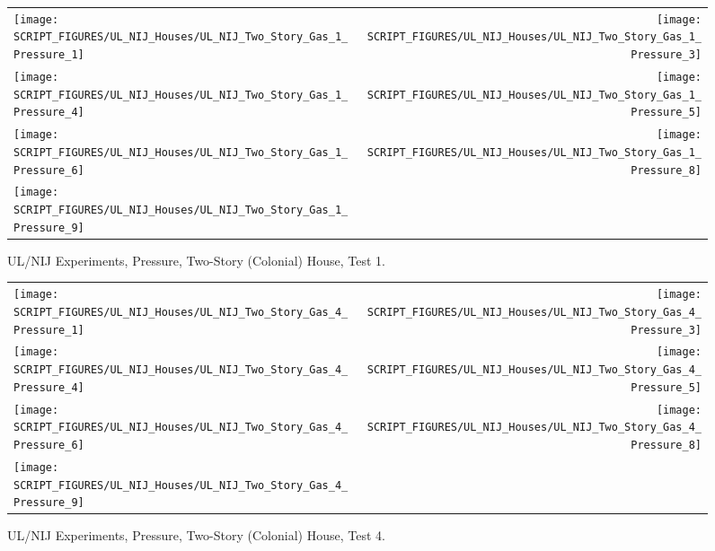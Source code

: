 \begin{figure}[p]
\begin{tabular*}{\textwidth}{l@{\extracolsep{\fill}}r}
\texttt{[image: SCRIPT\_FIGURES/UL\_NIJ\_Houses/UL\_NIJ\_Two\_Story\_Gas\_1\_Pressure\_1]} &
\texttt{[image: SCRIPT\_FIGURES/UL\_NIJ\_Houses/UL\_NIJ\_Two\_Story\_Gas\_1\_Pressure\_3]} \\
\texttt{[image: SCRIPT\_FIGURES/UL\_NIJ\_Houses/UL\_NIJ\_Two\_Story\_Gas\_1\_Pressure\_4]} &
\texttt{[image: SCRIPT\_FIGURES/UL\_NIJ\_Houses/UL\_NIJ\_Two\_Story\_Gas\_1\_Pressure\_5]} \\
\texttt{[image: SCRIPT\_FIGURES/UL\_NIJ\_Houses/UL\_NIJ\_Two\_Story\_Gas\_1\_Pressure\_6]} &
\texttt{[image: SCRIPT\_FIGURES/UL\_NIJ\_Houses/UL\_NIJ\_Two\_Story\_Gas\_1\_Pressure\_8]} \\
\texttt{[image: SCRIPT\_FIGURES/UL\_NIJ\_Houses/UL\_NIJ\_Two\_Story\_Gas\_1\_Pressure\_9]}
\end{tabular*}
\caption[UL/NIJ Experiments, Pressure, Two-Story (Colonial) House, Test 1]{UL/NIJ Experiments, Pressure, Two-Story (Colonial) House, Test 1.}
\label{UL_NIJ_Pres_Colonial_1}
\end{figure}

\begin{figure}[p]
\begin{tabular*}{\textwidth}{l@{\extracolsep{\fill}}r}
\texttt{[image: SCRIPT\_FIGURES/UL\_NIJ\_Houses/UL\_NIJ\_Two\_Story\_Gas\_4\_Pressure\_1]} &
\texttt{[image: SCRIPT\_FIGURES/UL\_NIJ\_Houses/UL\_NIJ\_Two\_Story\_Gas\_4\_Pressure\_3]} \\
\texttt{[image: SCRIPT\_FIGURES/UL\_NIJ\_Houses/UL\_NIJ\_Two\_Story\_Gas\_4\_Pressure\_4]} &
\texttt{[image: SCRIPT\_FIGURES/UL\_NIJ\_Houses/UL\_NIJ\_Two\_Story\_Gas\_4\_Pressure\_5]} \\
\texttt{[image: SCRIPT\_FIGURES/UL\_NIJ\_Houses/UL\_NIJ\_Two\_Story\_Gas\_4\_Pressure\_6]} &
\texttt{[image: SCRIPT\_FIGURES/UL\_NIJ\_Houses/UL\_NIJ\_Two\_Story\_Gas\_4\_Pressure\_8]} \\
\texttt{[image: SCRIPT\_FIGURES/UL\_NIJ\_Houses/UL\_NIJ\_Two\_Story\_Gas\_4\_Pressure\_9]}
\end{tabular*}
\caption[UL/NIJ Experiments, Pressure, Two-Story (Colonial) House, Test 4]{UL/NIJ Experiments, Pressure, Two-Story (Colonial) House, Test 4.}
\label{UL_NIJ_Pres_Colonial_4}
\end{figure}

